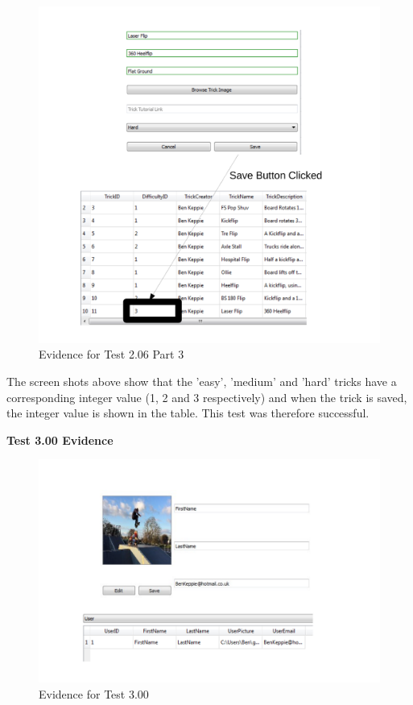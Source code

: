 \begin{figure}[H]
    \includegraphics[width=\textwidth]{./Testing/AnnotatedSamples/Test206p3.pdf}
    \caption{Evidence for Test 2.06 Part 3} \label{fig:Test 2.06 p3}
\end{figure}

The screen shots above show that the 'easy', 'medium' and 'hard' tricks have a corresponding integer value (1, 2 and 3 respectively) and when the trick is saved, the integer value is shown in the table. This test was therefore successful.


\textbf{Test 3.00 Evidence}

\begin{figure}[H]
    \includegraphics[width=\textwidth]{./Testing/AnnotatedSamples/Test300.pdf}
    \caption{Evidence for Test 3.00} \label{fig:Test 3.00}
\end{figure}

